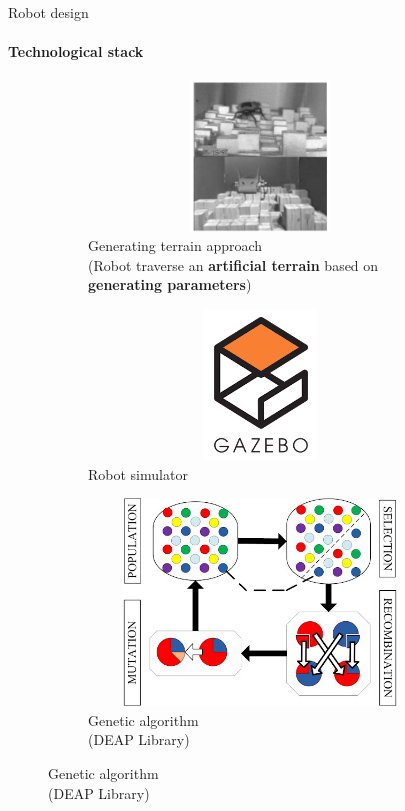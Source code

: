 \documentclass[aspectratio=169]{beamer}
\begin{document}
\begin{frame}[c]{Robot design}
    \framesubtitle{Technological stack}
    \vspace{-0.9cm}
    \begin{figure}[H]
        \begin{subfigure}[t]{0.32\textwidth}
            \centering\includegraphics[height=4cm,width=1\textwidth,keepaspectratio]{c1_paper.png}
            \caption*{\small Generating terrain approach \\ (Robot traverse an \textbf{artificial terrain} based on \textbf{generating parameters})}
        \end{subfigure}
        \hfill
        \begin{subfigure}[t]{0.32\textwidth}
            \centering\includegraphics[height=4cm,width=1\textwidth,keepaspectratio]{gazebo_logo.png}
            \caption*{Robot simulator}
        \end{subfigure}
        \hfill
        \begin{subfigure}[t]{0.32\textwidth}
            \centering\includegraphics[height=5.5cm,width=1\textwidth,keepaspectratio]{gen_algo.jpg}
            \caption*{Genetic algorithm \\ (DEAP Library)}
        \end{subfigure}
        \hfill
    \end{figure}
\end{frame}
\end{document}
